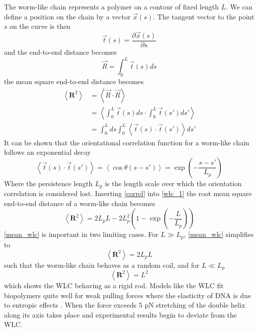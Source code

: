The worm-like chain represents a polymer on a contour of fixed length $L$. We can define a position on the chain by a vector $\vec{x}(s)$. The tangent vector to the point $s$ on the curve is then
%
\begin{equation}\label{wlc1}
\vec{t}(s)=\frac{\partial \vec{x}(s)}{\partial s}
\end{equation}
%
and the end-to-end distance becomes
%
\begin{equation}
\vec{R}=\int_{0}^{L}\vec{t}(s)ds
\end{equation}
%
the mean square end-to-end distance becomes
%
\begin{align}
\left\langle\mathbf{R}^{2}\right\rangle &= \left\langle\vec{R}\cdot\vec{R}\right\rangle\\
&=\left\langle\int_{0}^{L}\vec{t}(s)ds\cdot\int_{0}^{L}\vec{t}(s')ds'\right\rangle\\
&=\int_{0}^{L}ds\int_{0}^{L}\left\langle\vec{t}(s)\cdot\vec{t}(s')\right\rangle ds' \label{wlc_1}
\end{align}
%
It can be shown that the orientational correlation function for a worm-like chain follows an exponential decay \cite{Maarel2008}
%
\begin{equation}\label{correl}
\left\langle\vec{t}(s)\cdot\vec{t}(s')\right\rangle = \left\langle\cos \theta\left(s-s'\right)\right\rangle =\exp\left(-\frac{s-s'}{L_{p}}\right)
\end{equation}
%
Where the persistence length $L_{p}$ is the length scale over which the orientation correlation is considered lost. Inserting \eqref{correl} into \eqref{wlc_1} the root mean square end-to-end distance of a worm-like chain becomes
%
\begin{equation}\label{mean_wlc}
\left\langle\mathbf{R}^{2}\right\rangle = 2L_{p}L-2L_{p}^{2}\left(1-\exp\left(-\frac{L}{L_{p}}\right)\right) 
\end{equation}
%
\eqref{mean_wlc} is important in two limiting cases. For $L \gg L_{p}$, \eqref{mean_wlc} simplifies to 
%
\begin{equation}\label{mean_wlc_1}
\left\langle\mathbf{R}^{2}\right\rangle = 2L_{p}L
\end{equation}
%
such that the worm-like chain behaves as a random coil, and for $L \ll L_{p}$
%
\begin{equation}\label{mean_wlc_2}
\left\langle\mathbf{R}^{2}\right\rangle = L^{2} 
\end{equation}
%
which shows the WLC behaving as a rigid rod. Models like the WLC fit biopolymers quite well for weak pulling forces where the elasticity of DNA is due to entropic effects \cite{Peyrard2004}. When the force exceeds 5 pN stretching of the double helix along its axis takes place and experimental results begin to deviate from the WLC. 
